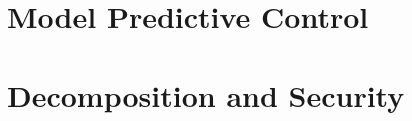 \documentclass[../main.tex]{subfiles}
\begin{document}


\part[Model Predictive Control - Decomposition and Security]{Model Predictive Control\\~\\ Decomposition and Security}\label{part:mpc_intro}








% 

% 

% 

% 

% 
\end{document}
